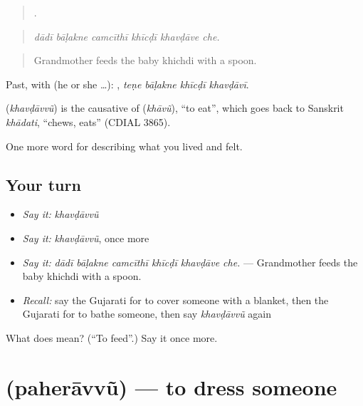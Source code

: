 \begin{quote}
     .
\end{quote}

\begin{quote}
\emph{dādī bāḷakne camcīthī khīcḍī khavḍāve che.}
\end{quote}

\begin{quote}
Grandmother feeds the baby khichdi with a spoon.
\end{quote}

Past, with  (he or she …):    , \emph{teṇe bāḷakne khīcḍī khavḍāvī}.

\begin{cousinweb}
\textbf{} (\emph{khavḍāvvũ}) is the causative of \textbf{} (\emph{khāvũ}), \textquotedblleft{}to eat\textquotedblright{}, which goes back to Sanskrit \emph{khādati}, \textquotedblleft{}chews, eats\textquotedblright{} (CDIAL 3865).
\end{cousinweb}

\begin{grammarlens}[title={What you've built}]
One more word for describing what you lived and felt.
\end{grammarlens}

\subsection*{Your turn}
\begin{itemize}
\raggedright
  \item \emph{Say it:} \emph{khavḍāvvũ}
  \item \emph{Say it:} \emph{khavḍāvvũ}, once more
  \item \emph{Say it:} \emph{dādī bāḷakne camcīthī khīcḍī khavḍāve che.} — Grandmother feeds the baby khichdi with a spoon.
  \item \emph{Recall:} say the Gujarati for to cover someone with a blanket, then the Gujarati for to bathe someone, then say \emph{khavḍāvvũ} again
\end{itemize}

\begin{tcolorbox}[breakable,colback=teal!4,colframe=teal!35!black,title={Before you move on}]
What does  mean? (\textquotedblleft{}To feed\textquotedblright{}.) Say it once more.
\end{tcolorbox}
\section[\texorpdfstring{\gu{પહેરાવવું} (paherāvvũ)}{પહેરાવવું (paherāvvũ)}]{ (paherāvvũ) — to dress someone}

